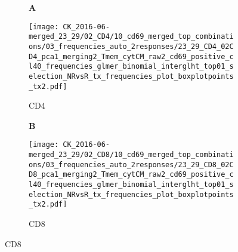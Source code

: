 \documentclass[a4paper, 12pt]{article}
\begin{document}
\begin{figure}[!thb]
\centering
    
    \caption{}
    \begin{subfigure}[t]{0.02\textwidth}
    \vskip 0pt
        \textbf{\textsf{\normalsize A}}
    \end{subfigure}
    \begin{subfigure}[t]{0.45\textwidth}
    \vskip 0pt
    \caption{CD4}
        \texttt{[image: CK\_2016-06-merged\_23\_29/02\_CD4/10\_cd69\_merged\_top\_combinations/03\_frequencies\_auto\_2responses/23\_29\_CD4\_02CD4\_pca1\_merging2\_Tmem\_cytCM\_raw2\_cd69\_positive\_cl40\_frequencies\_glmer\_binomial\_interglht\_top01\_selection\_NRvsR\_tx\_frequencies\_plot\_boxplotpoints\_tx2.pdf]}
    \end{subfigure}
\quad
    \begin{subfigure}[t]{0.02\textwidth}
    \vskip 0pt
        \textbf{\textsf{\normalsize B}}
    \end{subfigure}
    \begin{subfigure}[t]{0.45\textwidth}
    \vskip 0pt
    \caption{CD8}
        \texttt{[image: CK\_2016-06-merged\_23\_29/02\_CD8/10\_cd69\_merged\_top\_combinations/03\_frequencies\_auto\_2responses/23\_29\_CD8\_02CD8\_pca1\_merging2\_Tmem\_cytCM\_raw2\_cd69\_positive\_cl40\_frequencies\_glmer\_binomial\_interglht\_top01\_selection\_NRvsR\_tx\_frequencies\_plot\_boxplotpoints\_tx2.pdf]}
    \end{subfigure}
    
\end{figure}
\end{document}
